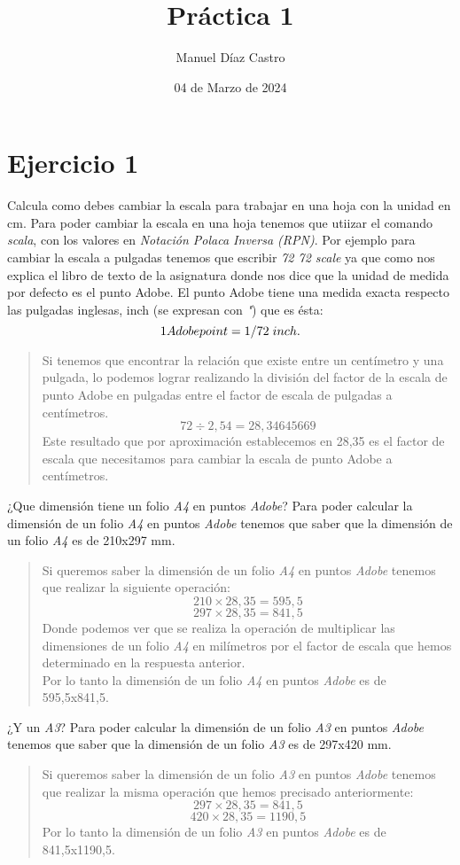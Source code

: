 \documentclass{article}
\title{Práctica 1 }
\author{Manuel Díaz Castro}
\date{04 de Marzo de 2024}
\begin{document}
\maketitle
\section*{Ejercicio 1}
\noindent Calcula como debes cambiar la escala para trabajar en una hoja
con la unidad en cm.
Para poder cambiar la escala en una hoja tenemos que utiizar el comando \emph{scala},
 con los valores en \textsl{Notación Polaca Inversa (RPN)}. Por ejemplo para cambiar la escala a pulgadas tenemos que
 escribir \emph{72 72 scale} ya que como nos explica el libro de texto de la asignatura donde nos dice que la unidad de medida por
  defecto es el punto Adobe. El punto Adobe
 tiene una medida exacta respecto las pulgadas inglesas, inch (se expresan
 con \emph{"}) que es ésta:
\[1 Adobe point = 1/72 \hspace{0.1cm} inch.\]
\begin{quote}    
 Si tenemos que encontrar la relación que existe entre un centímetro y 
 una pulgada, lo podemos lograr realizando la división del factor de la escala de punto Adobe
  en pulgadas entre el factor de escala de pulgadas a centímetros.
    \[ 72 \div 2,54 = 28,34645669 \]
    Este resultado que por aproximación establecemos en 28,35 es el factor de escala que necesitamos para 
    cambiar la escala de punto Adobe a centímetros.
\end{quote}
¿Que dimensión tiene un folio \emph{A4} en puntos \emph{Adobe}?
\indent Para poder calcular la dimensión de un folio \emph{A4} 
en puntos \emph{Adobe} tenemos que saber que la dimensión de un folio \emph{A4}
 es de 210x297 mm.
 \begin{quote}
    Si queremos saber la dimensión de un folio \emph{A4} 
    en puntos \emph{Adobe} tenemos que realizar la siguiente operación:
    \[ 210 \times 28,35 = 595,5 \]
    \[ 297 \times 28,35 = 841,5 \]
    Donde podemos ver que se realiza la operación de multiplicar 
    las dimensiones de un folio \emph{A4} en milímetros por el factor de escala 
    que hemos determinado en la respuesta anterior.\\
    Por lo tanto la dimensión de un folio \emph{A4} en puntos \emph{Adobe} es de 595,5x841,5.
 \end{quote}

\noindent¿Y un \emph{A3}?
\indent Para poder calcular la dimensión de un folio \emph{A3} en puntos \emph{Adobe} tenemos que saber que la dimensión de un folio \emph{A3}
 es de 297x420 mm.
 \begin{quote}
    Si queremos saber la dimensión de un folio \emph{A3} 
    en puntos \emph{Adobe} tenemos que realizar la misma operación que hemos precisado 
    anteriormente:
    \[ 297 \times 28,35 = 841,5 \]
    \[ 420 \times 28,35 = 1190,5 \]
    Por lo tanto la dimensión de un folio \emph{A3} 
    en puntos \emph{Adobe} es de 841,5x1190,5.
 \end{quote}
\end{document}
